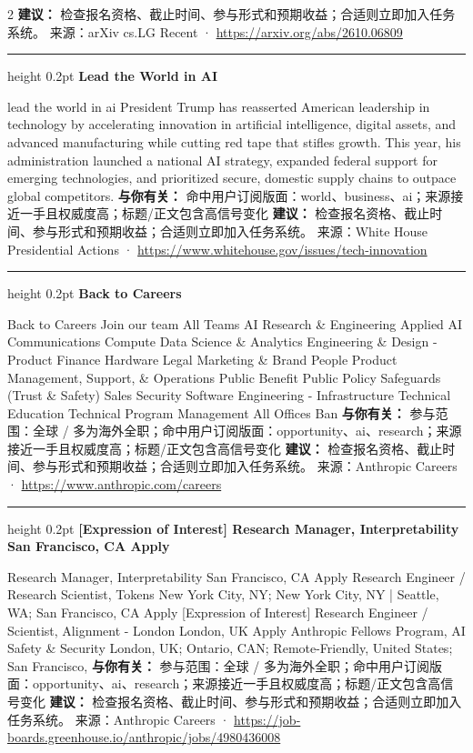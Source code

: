 \documentclass[10.5pt]{ctexart}
\begin{document}
\begin{multicols}{2}
\textbf{建议：} 检查报名资格、截止时间、参与形式和预期收益；合适则立即加入任务系统。
{\footnotesize\color{ormuted} 来源：arXiv cs.LG Recent · \url{https://arxiv.org/abs/2610.06809}}
\vspace{2mm}
\hrule height 0.2pt
\vspace{2mm}
{\large\bfseries Lead the World in AI}\par
lead the world in ai President Trump has reasserted American leadership in technology by accelerating innovation in artificial intelligence, digital assets, and advanced manufacturing while cutting red tape that stifles growth. This year, his administration launched a national AI strategy, expanded federal support for emerging technologies, and prioritized secure, domestic supply chains to outpace global competitors.
\textbf{与你有关：} 命中用户订阅版面：world、business、ai；来源接近一手且权威度高；标题/正文包含高信号变化
\textbf{建议：} 检查报名资格、截止时间、参与形式和预期收益；合适则立即加入任务系统。
{\footnotesize\color{ormuted} 来源：White House Presidential Actions · \url{https://www.whitehouse.gov/issues/tech-innovation}}
\vspace{2mm}
\hrule height 0.2pt
\vspace{2mm}
{\large\bfseries Back to Careers}\par
Back to Careers Join our team All Teams AI Research \& Engineering Applied AI Communications Compute Data Science \& Analytics Engineering \& Design - Product Finance Hardware Legal Marketing \& Brand People Product Management, Support, \& Operations Public Benefit Public Policy Safeguards (Trust \& Safety) Sales Security Software Engineering - Infrastructure Technical Education Technical Program Management All Offices Ban
\textbf{与你有关：} 参与范围：全球 / 多为海外全职；命中用户订阅版面：opportunity、ai、research；来源接近一手且权威度高；标题/正文包含高信号变化
\textbf{建议：} 检查报名资格、截止时间、参与形式和预期收益；合适则立即加入任务系统。
{\footnotesize\color{ormuted} 来源：Anthropic Careers · \url{https://www.anthropic.com/careers}}
\vspace{2mm}
\hrule height 0.2pt
\vspace{2mm}
{\large\bfseries [Expression of Interest] Research Manager, Interpretability San Francisco, CA Apply}\par
[Expression of Interest] Research Manager, Interpretability San Francisco, CA Apply Research Engineer / Research Scientist, Tokens New York City, NY; New York City, NY | Seattle, WA; San Francisco, CA Apply [Expression of Interest] Research Engineer / Scientist, Alignment - London London, UK Apply Anthropic Fellows Program, AI Safety \& Security London, UK; Ontario, CAN; Remote-Friendly, United States; San Francisco, 
\textbf{与你有关：} 参与范围：全球 / 多为海外全职；命中用户订阅版面：opportunity、ai、research；来源接近一手且权威度高；标题/正文包含高信号变化
\textbf{建议：} 检查报名资格、截止时间、参与形式和预期收益；合适则立即加入任务系统。
{\footnotesize\color{ormuted} 来源：Anthropic Careers · \url{https://job-boards.greenhouse.io/anthropic/jobs/4980436008}}
\end{multicols}
\end{document}
